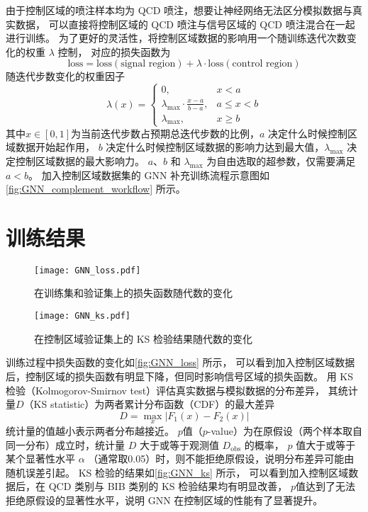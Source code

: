 由于控制区域的喷注样本均为 QCD 喷注，想要让神经网络无法区分模拟数据与真实数据，
可以直接将控制区域的 QCD 喷注与信号区域的 QCD 喷注混合在一起进行训练。
为了更好的灵活性，将控制区域数据的影响用一个随训练迭代次数变化的权重 $\lambda$ 控制，
对应的损失函数为
\begin{equation}
    \text{loss} = \text{loss}(\text{signal region}) + \lambda \cdot \text{loss}(\text{control region})
\end{equation}
随迭代步数变化的权重因子
\begin{equation}
    \lambda(x) = \begin{cases}
        0,                                    & x < a        \\
        \lambda_{\max} \cdot \frac{x-a}{b-a}, & a \leq x < b \\
        \lambda_{\max},                       & x \geq b
    \end{cases}
\end{equation}
其中$x \in [0, 1]$为当前迭代步数占预期总迭代步数的比例，$a$ 决定什么时候控制区域数据开始起作用，
$b$ 决定什么时候控制区域数据的影响力达到最大值，$\lambda_{\max}$ 决定控制区域数据的最大影响力。
$a$、$b$ 和 $\lambda_{\max}$ 为自由选取的超参数，仅需要满足$a<b$。
加入控制区域数据集的 GNN 补充训练流程示意图如\autoref{fig:GNN_complement_workflow} 所示。


\section{训练结果}
\begin{figure}[ht]
    \centering
    \texttt{[image: GNN\_loss.pdf]}
    \caption{在训练集和验证集上的损失函数随代数的变化}
    \label{fig:GNN_loss}
\end{figure}

\begin{figure}[ht]
    \centering
    \texttt{[image: GNN\_ks.pdf]}
    \caption{在控制区域验证集上的 KS 检验结果随代数的变化}
    \label{fig:GNN_ks}
\end{figure}

训练过程中损失函数的变化如\autoref{fig:GNN_loss} 所示，
可以看到加入控制区域数据后，控制区域的损失函数有明显下降，但同时影响信号区域的损失函数。
用 KS 检验（Kolmogorov-Smirnov test）评估真实数据与模拟数据的分布差异，
其统计量$D$（KS statistic）为两者累计分布函数（CDF）的最大差异
\begin{equation}
    D = \max\limits_{x} |F_1(x) - F_2(x)|
\end{equation}
统计量的值越小表示两者分布越接近。
$p$值（$p$-value）为在原假设（两个样本取自同一分布）成立时，统计量 $D$ 大于或等于观测值 $D_{\text{obs}}$ 的概率，
$p$ 值大于或等于某个显著性水平 $\alpha$ （通常取0.05）时，则不能拒绝原假设，说明分布差异可能由随机误差引起。
KS 检验的结果如\autoref{fig:GNN_ks} 所示，
可以看到加入控制区域数据后，在 QCD 类别与 BIB 类别的 KS 检验结果均有明显改善，
$p$值达到了无法拒绝原假设的显著性水平，说明 GNN 在控制区域的性能有了显著提升。

